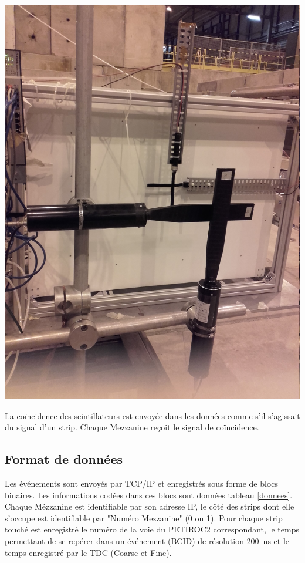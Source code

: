 \marginpar
{
	\centering
	\includegraphics[width=\marginparwidth]{ELE/BigSmallScintillators.jpg}
	\label{smallPM}
}

La coïncidence des scintillateurs est envoyée dans les données comme s'il s'agissait du signal d'un strip. Chaque Mezzanine reçoit le signal de coïncidence.
\vspace*{-0.4cm}
\subsection{Format de données}
\vspace*{-0.4cm}
Les événements sont envoyés par TCP/IP et enregistrés sous forme de blocs binaires. Les informations codées dans ces blocs sont données tableau \ref{donnees}. Chaque Mézzanine est identifiable par son adresse IP, le côté des strips dont elle s'occupe est identifiable par "Numéro Mezzanine" (\num{0} ou \num{1}). Pour chaque strip touché est enregistré le numéro de la voie du PETIROC2 correspondant, le temps permettant de se repérer dans un événement (BCID) de résolution \SI{200}{\nano\second} et le temps enregistré par le TDC (Coarse et Fine).

